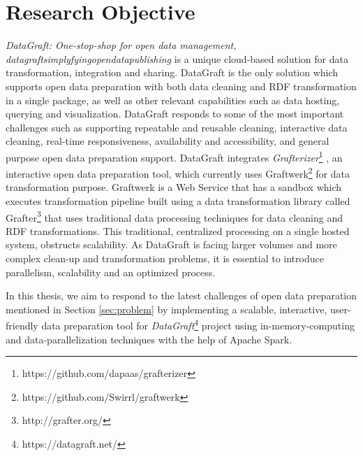 \section{Research Objective}
\noindent \textit{DataGraft: One-stop-shop for open data management, datagraftsimplyfyingopendatapublishing} \cite{onestopshotforopendata}  is a unique cloud-based solution for data transformation, integration and sharing. DataGraft is the only solution which supports open data preparation with both data cleaning and RDF transformation in a single package, as well as other relevant capabilities such as data hosting, querying and visualization. DataGraft responds to some of the most important challenges such as supporting repeatable and reusable cleaning, interactive data cleaning, real-time responsiveness, availability and accessibility, and general purpose open data preparation support. DataGraft integrates \textit{Grafterizer}\footnote{https://github.com/dapaas/grafterizer} \cite{tabular-grafterizer}, an interactive open data preparation tool, which currently uses Graftwerk\footnote{https://github.com/Swirrl/graftwerk} for data transformation purpose. Graftwerk is a Web Service that has a sandbox which executes transformation pipeline built using a data transformation library called Grafter\footnote{http://grafter.org/} that uses traditional data processing techniques for data cleaning and RDF transformations. This traditional, centralized processing on a single hosted system, obstructs scalability. As DataGraft is facing larger volumes and more complex clean-up and transformation problems, it is essential to introduce parallelism, scalability and an optimized process. 

In this thesis, we aim to respond to the latest challenges of open data preparation mentioned in Section \ref{sec:problem} by implementing a scalable, interactive, user-friendly data preparation tool for \textit{DataGraft}\footnote{https://datagraft.net/} project using in-memory-computing and data-parallelization techniques with the help of Apache Spark.

